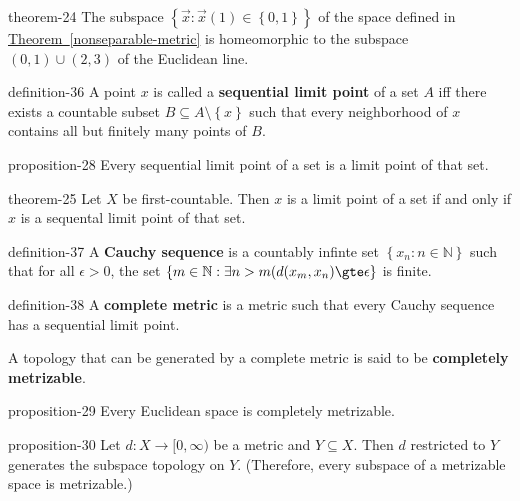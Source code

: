 \documentclass[10pt,]{article}
\newcommand{\terminology}[1]{\textbf{#1}}
\newcommand{\mb}{\mathbb}
\newcommand{\setBuilder}[2]{\left\{#1:#2\right\}}
\newcommand{\setList}[1]{\left\{#1\right\}}
\newcommand{\gt}{>}
\begin{document}
\begin{theorem}{}{}{theorem-24}%
\hypertarget{p-125}{}%
The subspace \(\setBuilder{\vec x}{\vec{x}(1)\in\setList{0,1}}\) of the space defined in \hyperref[nonseparable-metric]{Theorem~\ref{nonseparable-metric}} is homeomorphic to the subspace \((0,1)\cup(2,3)\) of the Euclidean line.%
\end{theorem}
\begin{definition}{}{definition-36}%
\hypertarget{p-126}{}%
A point \(x\) is called a \terminology{sequential limit point} of a set \(A\) iff there exists a countable subset \(B\subseteq A\setminus\setList{x}\) such that every neighborhood of \(x\) contains all but finitely many points of \(B\).%
\end{definition}
\begin{proposition}{}{}{proposition-28}%
\hypertarget{p-127}{}%
Every sequential limit point of a set is a limit point of that set.%
\end{proposition}
\begin{theorem}{}{}{theorem-25}%
\hypertarget{p-128}{}%
Let \(X\) be first-countable. Then \(x\) is a limit point of a set if and only if \(x\) is a sequental limit point of that set.%
\end{theorem}
\begin{definition}{}{definition-37}%
\hypertarget{p-129}{}%
A \terminology{Cauchy sequence} is a countably infinte set \(\setBuilder{x_n}{n\in\mb N}\) such that for all \(\epsilon\gt0\), the set \(\setBuilder{m\in\mb N}{\exists n>m(d(x_m,x_n)\gte\epsilon}\) is finite.%
\end{definition}
\begin{definition}{}{definition-38}%
\hypertarget{p-130}{}%
A \terminology{complete metric} is a metric such that every Cauchy sequence has a sequential limit point.%
\par
\hypertarget{p-131}{}%
A topology that can be generated by a complete metric is said to be \terminology{completely metrizable}.%
\end{definition}
\begin{proposition}{}{}{proposition-29}%
\hypertarget{p-132}{}%
Every Euclidean space is completely metrizable.%
\end{proposition}
\begin{proposition}{}{}{proposition-30}%
\hypertarget{p-133}{}%
Let \(d:X\to[0,\infty)\) be a metric and \(Y\subseteq X\). Then \(d\) restricted to \(Y\) generates the subspace topology on \(Y\). (Therefore, every subspace of a metrizable space is metrizable.)%
\end{proposition}
\end{document}
